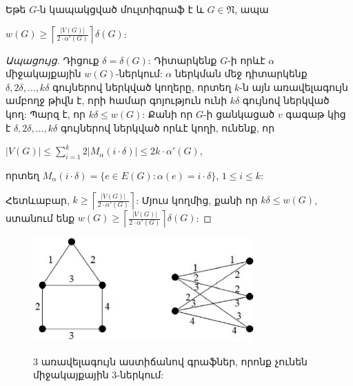 \begin{theorem}
\label{t1_lower_matching_number} Եթե $G$-ն կապակցված մուլտիգրաֆ է և $G\in \mathfrak{N}$, ապա
\begin{center}
$w(G)\geq \left\lceil \frac{\vert V(G)\vert}{2\cdot
\alpha'(G)}\right\rceil\delta(G)$:
\end{center}
\end{theorem}

\begin{proof}[Ապացույց] Դիցուք $\delta=\delta(G)$: Դիտարկենք $G$-ի որևէ $\alpha$ միջակայքային $w(G)$-ներկում: $\alpha$ ներկման մեջ դիտարկենք $\delta,2\delta,\ldots,k\delta$ գույներով ներկված կողերը, որտեղ $k$-ն այն առավելագույն ամբողջ թիվն է, որի համար գոյություն ունի $k\delta$ գույնով ներկված կող:
Պարզ է, որ $k\delta\leq w(G)$: Քանի որ $G$-ի ցանկացած $v$ գագաթ կից է
$\delta,2\delta,\ldots,k\delta$ գույներով ներկված որևէ կողի, ունենք, որ

\begin{center}
$\vert V(G)\vert\leq {\sum\limits_{i=1}^{k}2\vert
M_{\alpha}(i\cdot\delta)\vert}\leq 2k\cdot\alpha'(G)$,
\end{center}
որտեղ $M_{\alpha}(i\cdot\delta)=
\{e \in E(G) : \alpha(e)=i\cdot\delta\}$, $1\leq i\leq k$:

Հետևաբար, $k\geq \left\lceil \frac{\vert V(G)\vert}{2\cdot
\alpha'(G)}\right\rceil$: Մյուս կողմից, քանի որ $k\delta\leq w(G)$,
ստանում ենք $w(G)\geq \left\lceil \frac{\vert V(G)\vert}{2\cdot
\alpha'(G)}\right\rceil\delta(G)$:
\end{proof}

\begin{hide}
\begin{figure}[h]
\begin{center}
\includegraphics[width=20pc]{figures/W-bound-fig1.eps}\\
\caption{$3$ առավելագույն աստիճանով գրաֆներ, որոնք չունեն միջակայքային $3$-ներկում:}
\label{f1_cubic}
\end{center}
\end{figure}
\end{hide}

